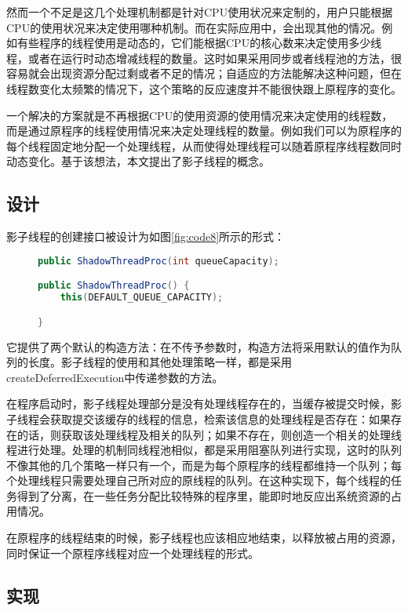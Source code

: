 然而一个不足是这几个处理机制都是针对CPU使用状况来定制的，用户只能根据CPU的使用状况来决定使用哪种机制。而在实际应用中，会出现其他的情况。例如有些程序的线程使用是动态的，它们能根据CPU的核心数来决定使用多少线程，或者在运行时动态增减线程的数量。这时如果采用同步或者线程池的方法，很容易就会出现资源分配过剩或者不足的情况；自适应的方法能解决这种问题，但在线程数变化太频繁的情况下，这个策略的反应速度并不能很快跟上原程序的变化。

一个解决的方案就是不再根据CPU的使用资源的使用情况来决定使用的线程数，而是通过原程序的线程使用情况来决定处理线程的数量。例如我们可以为原程序的每个线程固定地分配一个处理线程，从而使得处理线程可以随着原程序线程数同时动态变化。基于该想法，本文提出了影子线程的概念。

\subsection{设计}

影子线程的创建接口被设计为如图\ref{fig:code8}所示的形式：

\begin{figure}[!htp]
\begin{lstlisting}[language=Java]
public ShadowThreadProc(int queueCapacity);

public ShadowThreadProc() {
	this(DEFAULT_QUEUE_CAPACITY);

}
\end{lstlisting}
\end{figure}

它提供了两个默认的构造方法：在不传予参数时，构造方法将采用默认的值作为队列的长度。影子线程的使用和其他处理策略一样，都是采用createDeferredExecution中传递参数的方法。

在程序启动时，影子线程处理部分是没有处理线程存在的，当缓存被提交时候，影子线程会获取提交该缓存的线程的信息，检索该信息的处理线程是否存在：如果存在的话，则获取该处理线程及相关的队列；如果不存在，则创造一个相关的处理线程进行处理。处理的机制同线程池相似，都是采用阻塞队列进行实现，这时的队列不像其他的几个策略一样只有一个，而是为每个原程序的线程都维持一个队列；每个处理线程只需要处理自己所对应的原线程的队列。在这种实现下，每个线程的任务得到了分离，在一些任务分配比较特殊的程序里，能即时地反应出系统资源的占用情况。

在原程序的线程结束的时候，影子线程也应该相应地结束，以释放被占用的资源，同时保证一个原程序线程对应一个处理线程的形式。

\subsection{实现}

